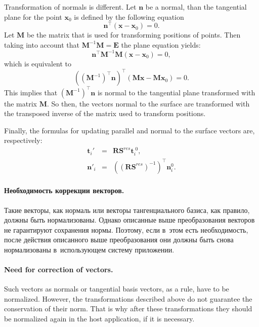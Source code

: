 \documentclass[a4paper, 12pt, titlepage]{extarticle}
\newcommand{\vect}[1]{\mathbf{#1}} %
\newcommand{\matx}[1]{\mathbf{#1}} %
\newcommand{\transposed}{\top} %
\begin{document}
        Transformation of normals is different. Let $\vect n$ be a normal, than the tangential plane
        for the point $\vect{x}_0$ is defined by the following equation
        \[
        \vect{n}^\transposed (\vect x - \vect{x}_0) = 0.
        \]
        Let $\matx M$ be the matrix that is used for transforming positions of points. Then taking
        into account that $\matx{M}^{-1} \matx{M} = \matx{E}$ the plane equation yields:
        \[
          \vect{n}^\transposed \matx{M}^{-1} \matx{M} (\vect x - \vect{x}_0) = 0,
        \]
        which is equivalent to
        \[
           \left( (\matx{M}^{-1})^\transposed \vect{n} \right)^\transposed (\matx{M} \vect x - \matx{M} \vect{x}_0) = 0.
        \]
        This implies that $(\matx{M}^{-1})^\transposed \vect{n}$ is normal to the tangential plane
        transformed with the matrix $\matx M$. So then, the vectors normal to the surface are
        transformed with the transposed inverse of the matrix used to transform positions.

        Finally, the formulas for updating parallel and normal to the surface vectors are, respectively:
        \begin{eqnarray}
          \vect{t}_i\!' & = & \matx{R} \matx{S}^{res} \vect{t}^{\;0}_i, \label{eq:tangent_vectors} \\
          \vect{n}'_i & = & \left(\left(\matx{R} \matx{S}^{res}\right)^{-1}\right)^\transposed \vect{n}^0_i. \label{eq:normal_vectors}
        \end{eqnarray}

\begin{original}
        \paragraph{Необходимость коррекции векторов.}
        Такие векторы, как нормаль или векторы тангенциального базиса, как правило, должны быть
        нормализованы. Однако описанные выше преобразования векторов не гарантируют сохранения
        нормы. Поэтому, если в~этом есть необходимость, после действия описанного выше преобразования
        они должны быть снова нормализованы в~использующем систему приложении.
\end{original}

        \paragraph{Need for correction of vectors.}
        Such vectors as normals or tangential basis vectors, as a rule, have to be normalized.
        However, the transformations described above do not guarantee the conservation of their
        norm. That is why after these transformations they should be normalized again in the host
        application, if it is necessary.
\end{document}
